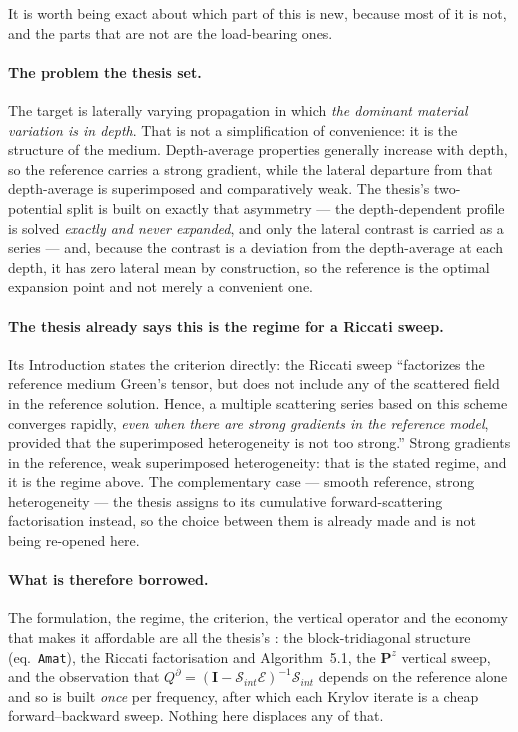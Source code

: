 \documentclass[11pt,a4paper]{article}
\newcommand{\bI}{\mathbf{I}}
\newcommand{\bP}{\mathbf{P}}
\begin{document}
It is worth being exact about which part of this is new, because most of it is
not, and the parts that are not are the load-bearing ones.

\paragraph{The problem the thesis set.}  The target is laterally varying
propagation in which \emph{the dominant material variation is in depth}.  That is
not a simplification of convenience: it is the structure of the medium.
Depth-average properties generally increase with depth, so the reference carries
a strong gradient, while the lateral departure from that depth-average is
superimposed and comparatively weak.  The thesis's two-potential split is built
on exactly that asymmetry --- the depth-dependent profile is solved
\emph{exactly and never expanded}, and only the lateral contrast is carried as a
series --- and, because the contrast is a deviation from the depth-average at
each depth, it has zero lateral mean by construction, so the reference is the
optimal expansion point and not merely a convenient one.

\paragraph{The thesis already says this is the regime for a Riccati sweep.}
Its Introduction states the criterion directly: the Riccati sweep ``factorizes
the reference medium Green's tensor, but does not include any of the scattered
field in the reference solution.  Hence, a multiple scattering series based on
this scheme converges rapidly, \emph{even when there are strong gradients in the
reference model}, provided that the superimposed heterogeneity is not too
strong.''  Strong gradients in the reference, weak superimposed heterogeneity:
that is the stated regime, and it is the regime above.  The complementary case
--- smooth reference, strong heterogeneity --- the thesis assigns to its
cumulative forward-scattering factorisation instead, so the choice between them
is already made and is not being re-opened here.

\paragraph{What is therefore borrowed.}  The formulation, the regime, the
criterion, the vertical operator and the economy that makes it affordable are
all the thesis's \cite{nestor1996}: the block-tridiagonal structure
(eq.~\texttt{Amat}), the Riccati factorisation and Algorithm~5.1, the
$\bP^{z}$ vertical sweep, and the observation that
$Q^{\partial} = (\bI - \mathcal{S}_{int}\mathcal{E})^{-1}\mathcal{S}_{int}$
depends on the reference alone and so is built \emph{once} per frequency, after
which each Krylov iterate is a cheap forward--backward sweep.  Nothing here
displaces any of that.
\end{document}
